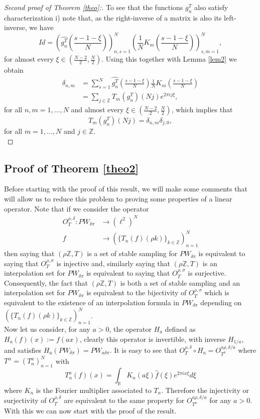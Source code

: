\documentclass[reqno]{amsart}
\theoremstyle{plain}
\theoremstyle{definition}
\numberwithin{equation}{section}
\newcommand{\Z}{{\mathbb Z}}
\newcommand{\R}{{\mathbb R}}
\newcommand{\pa}[1]{\left(#1\right)}
\begin{document}
\begin{proof}[Second proof of Theorem \ref{theo}:]
    To see that the functions $g^T_n$ also satisfy characterization i) note that, as the right-inverse 
    of a matrix is also its left-inverse, we have
    $$Id=\pa{\widehat{g^T_n}\pa{\frac{s-1-\xi}{N}}}_{n,s=1}^N \pa{\frac{1}{N}K_m\pa{\frac{s-1-\xi}{N}}}_{s,m=1}^N,$$
    for almost every $\xi\in \pa{\frac{N-2}{2},\frac{N}{2}}$. Using this together with Lemma \ref{lem2} we obtain
    \begin{align*}
    	\delta_{n,m} &=\sum_{s=1}^N \widehat{g^T_n}\pa{\frac{s-1-\xi}{N}} \frac{1}{N}K_m\pa{\frac{s-1-\xi}{N}} \\
    	&= \sum_{j\in\Z} T_m\pa{g^T_n}(Nj) e^{2\pi i j \xi},
    \end{align*}
    for all $n,m=1,...,N$ and almost every $\xi\in \pa{\frac{N-2}{2},\frac{N}{2}}$, which implies that
    $$T_m\pa{g^T_n}(Nj)=\delta_{n,m}\delta_{j,0},$$
	for all $m=1,...,N$ and $j\in\Z$. \\
\end{proof}


\subsection{Proof of Theorem \ref{theo2}}

Before starting with the proof of this result, we will make some comments that will allow us to reduce this problem to proving some properties of a linear operator. Note that if we consider the operator
\begin{align*}
	O^{\rho,\delta}_T:  PW_{\delta\pi} &\to \pa{\ell^2}^N \\
	f \quad &\to \pa{\{T_n(f)(\rho k)\}_{k\in\Z}}_{n=1}^N
\end{align*}
then saying that $\pa{\rho\Z,T}$ is a set of stable sampling for $PW_{\delta\pi}$ is equivalent to saying that $O^{\rho,\sigma}_T$ is injective and, similarly saying that $\pa{\rho\Z,T}$ is an interpolation set for $PW_{\delta\pi}$ is equivalent to saying that $O^{\rho,\sigma}_T$ is surjective. Consequently, the fact that $\pa{\rho\Z,T}$ is both a set of stable sampling and an interpolation set for $PW_{\delta\pi}$ is equivalent to the bijectivity of $O^{\rho,\sigma}_T$ which is equivalent to the existence of an interpolation formula in $PW_{\delta\pi}$ depending on $\pa{\{T_n(f)(\rho k)\}_{k\in\Z}}_{n=1}^N$. \\

Now let us consider, for any $a>0$, the operator $H_a$ defined as $H_a(f)(x):=f(ax)$, clearly this operator is invertible, with inverse $H_{1/a}$, and satisfies $H_a(PW_{\delta\pi})=PW_{a\delta\pi}$. It is easy to see that $O^{\rho,\delta}_T\circ H_a=O^{a\rho,\delta/a}_{T^a}$ where $T^\alpha=\pa{T^a_n}_{n=1}^N$ with 
$$T^a_n(f)(x)=\int_\R K_n(a\xi) \widehat{f}(\xi) e^{2\pi i x \xi} d\xi$$
where $K_n$ is the Fourier multiplier associated to $T_n$. Therefore the injectivity or surjectivity of $O^{\rho,\delta}_T$ are equivalent to the same property for $O^{a\rho,\delta/a}_{T^a}$ for any $a>0$. With this we can now start with the proof of the result.
\end{document}
